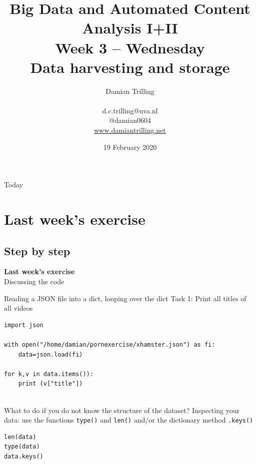 \documentclass{beamer}
\title[Big Data and Automated Content Analysis]{\textbf{Big Data and Automated Content Analysis I+II} \\ Week 3 -- Wednesday \\  Data harvesting and storage}
\author[Damian Trilling]{Damian Trilling \\ ~ \\ \footnotesize{d.c.trilling@uva.nl \\@damian0604} \\ \url{www.damiantrilling.net}}
\date{19 February 2020}
\institute[UvA]{Afdeling Communicatiewetenschap \\Universiteit van Amsterdam}
\begin{document}
\begin{frame}{}
\titlepage
\end{frame}

\begin{frame}{Today}
\tableofcontents
\end{frame}



\section{Last week's exercise}
\subsection{Step by step}
\begin{frame}[plain]
\textbf{Last week's exercise}\\
\vspace{1cm}
Discussing the code
\end{frame}



\begin{frame}[fragile]{Reading a JSON file into a dict, looping over the dict}
Task 1: Print all titles of all videos
\begin{lstlisting}
import json

with open("/home/damian/pornexercise/xhamster.json") as fi:
    data=json.load(fi)

for k,v in data.items()):
    print (v["title"])
            
\end{lstlisting}
\end{frame}


\begin{frame}[fragile]{What to do if you do not know the structure of the dataset?}
	Inspecting your data: use the functions \texttt{type()} and \texttt{len()} and/or the dictionary method \texttt{.keys()}
\begin{lstlisting}
len(data)
type(data)
data.keys()
\end{lstlisting}
\end{frame}
\end{document}
